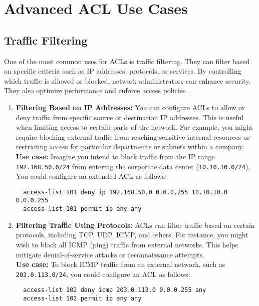\documentclass[11pt,a4paper]{article}
\begin{document}
\section*{Advanced ACL Use Cases}
    \subsection*{Traffic Filtering}
        One of the most common uses for ACLs is traffic filtering. They can filter based on specific criteria such as IP addresses, protocols, or services. By controlling which traffic is allowed or blocked, network administrators can enhance security. They also optimize performance and enforce access policies~\cite{Traffic-Filtering}.
            \begin{enumerate}
                \item \textbf{Filtering Based on IP Addresses:} You can configure ACLs to allow or deny traffic from specific source or destination IP addresses. This is useful when limiting access to certain parts of the network. For example, you might require blocking external traffic from reaching sensitive internal resources or restricting access for particular departments or subnets within a company.
                \\[1em]
                \textbf{Use case:} Imagine you intend to block traffic from the IP range \lstinline{192.168.50.0/24} from entering the corporate data center (\lstinline{10.10.10.0/24}). You could configure an extended ACL as follows:
\begin{lstlisting}
  access-list 101 deny ip 192.168.50.0 0.0.0.255 10.10.10.0 0.0.0.255
  access-list 101 permit ip any any
\end{lstlisting}


                \item \textbf{Filtering Traffic Using Protocols:} ACLs can filter traffic based on certain protocols, including TCP, UDP, ICMP, and others. For instance, you might wish to block all ICMP (ping) traffic from external networks. This helps mitigate denial-of-service attacks or reconnaissance attempts.
                \\[1em]
                \textbf{Use case:} To block ICMP traffic from an external network, such as \lstinline{203.0.113.0/24}, you could configure an ACL as follows:
\begin{lstlisting}
  access-list 102 deny icmp 203.0.113.0 0.0.0.255 any
  access-list 102 permit ip any any
\end{lstlisting}


\end{enumerate}
\end{document}
